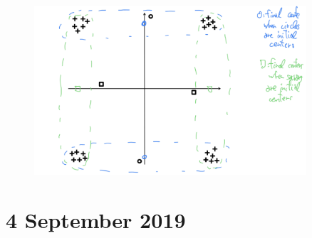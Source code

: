 \documentclass[a4paper,11pt,oneside]{book}
\begin{document}
\begin{enumerate}
\begin{solution}
\begin{figure}[H]
                \centering
                \includegraphics[width=0.9\textwidth,height=0.6\textheight,keepaspectratio]{images/3_4_7_Feb_2020.png}
            \end{figure}
        \end{solution}
\end{enumerate}


\chapter{4 September 2019}
\end{document}

